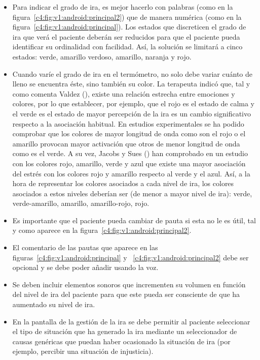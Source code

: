 \begin{itemize}
    \item Para indicar el grado de ira, es mejor hacerlo con palabras (como en la figura~\ref{c4:fig:v1:android:principal2}) que de manera numérica (como en la figura~\ref{c4:fig:v1:android:principal}). Los estados que discreticen el grado de ira que verá el paciente deberán ser reducidos para que el paciente pueda identificar su ordinalidad con facilidad. Así, la solución se limitará a cinco estados: verde, amarillo verdoso, amarillo, naranja y rojo.
    \item Cuando varíe el grado de ira en el termómetro, no solo debe variar cuánto de lleno se encuentra éste, sino también su color. La terapeuta indicó que, tal y como comenta Valdez (\citeyear{valdez1994effects}), existe una relación estrecha entre emociones y colores, por lo que establecer, por ejemplo, que el rojo es el estado de calma y el verde es el estado de mayor percepción de la ira es un cambio significativo respecto a la asociación habitual. En estudios experimentales se ha podido comprobar que los colores de mayor longitud de onda como son el rojo o el amarillo provocan mayor activación que otros de menor longitud de onda como es el verde. A su vez, Jacobs y Sues (\citeyear{jacobs1975effects}) han comprobado en un estudio con los colores rojo, amarillo, verde y azul que existe una mayor asociación del estrés con los colores rojo y amarillo respecto al verde y el azul. Así, a la hora de representar los colores asociados a cada nivel de ira, los colores asociados a estos niveles deberían ser (de menor a mayor nivel de ira): verde, verde-amarillo, amarillo, amarillo-rojo, rojo.
    \item Es importante que el paciente pueda cambiar de pauta si esta no le es útil, tal y como aparece en la figura~\ref{c4:fig:v1:android:principal2}.
    \item El comentario de las pautas que aparece en las figuras~\ref{c4:fig:v1:android:principal} y ~\ref{c4:fig:v1:android:principal2} debe ser opcional y se debe poder añadir usando la voz.
    \item Se deben incluir elementos sonoros que incrementen su volumen en función del nivel de ira del paciente para que este pueda ser consciente de que ha aumentado su nivel de ira.
    \item En la pantalla de la gestión de la ira se debe permitir al paciente seleccionar el tipo de situación que ha generado la ira mediante un seleccionador de causas genéricas que puedan haber ocasionado la situación de ira (por ejemplo, percibir una situación de injusticia).
\end{itemize}

